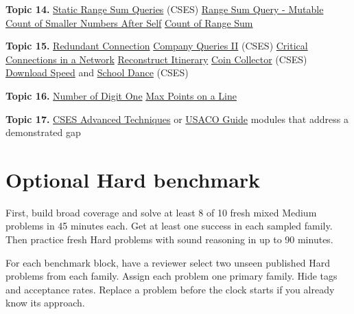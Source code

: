 \documentclass[11pt,letterpaper]{article}
\begin{document}
\textbf{Topic 14.} \href{https://cses.fi/problemset/task/1646}{Static Range Sum Queries} (CSES) \textperiodcentered{} \href{https://leetcode.com/problems/range-sum-query-mutable/}{Range Sum Query - Mutable} \textperiodcentered{} \href{https://leetcode.com/problems/count-of-smaller-numbers-after-self/}{Count of Smaller Numbers After Self} \textperiodcentered{} \href{https://leetcode.com/problems/count-of-range-sum/}{Count of Range Sum}

\textbf{Topic 15.} \href{https://leetcode.com/problems/redundant-connection/}{Redundant Connection} \textperiodcentered{} \href{https://cses.fi/problemset/task/1688}{Company Queries II} (CSES) \textperiodcentered{} \href{https://leetcode.com/problems/critical-connections-in-a-network/}{Critical Connections in a Network} \textperiodcentered{} \href{https://leetcode.com/problems/reconstruct-itinerary/}{Reconstruct Itinerary} \textperiodcentered{} \href{https://cses.fi/problemset/task/1686}{Coin Collector} (CSES) \textperiodcentered{} \href{https://cses.fi/problemset/task/1694}{Download Speed} and \href{https://cses.fi/problemset/task/1696}{School Dance} (CSES)

\textbf{Topic 16.} \href{https://leetcode.com/problems/number-of-digit-one/}{Number of Digit One} \textperiodcentered{} \href{https://leetcode.com/problems/max-points-on-a-line/}{Max Points on a Line}

\textbf{Topic 17.} \href{https://cses.fi/problemset/}{CSES Advanced Techniques} or \href{https://usaco.guide/}{USACO Guide} modules that address a demonstrated gap

\clearpage

\section{Optional Hard benchmark}\label{hard-benchmark}

First, build broad coverage and solve at least 8 of 10 fresh mixed Medium problems in 45 minutes each. Get at least one success in each sampled family. Then practice fresh Hard problems with sound reasoning in up to 90 minutes.

For each benchmark block, have a reviewer select two unseen published Hard problems from each family. Assign each problem one primary family. Hide tags and acceptance rates. Replace a problem before the clock starts if you already know its approach.
\end{document}
